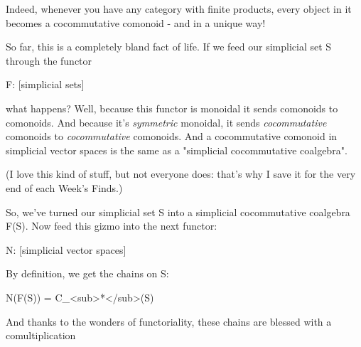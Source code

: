Indeed, whenever you have any category with finite products, every
object in it becomes a cocommutative comonoid - and in a unique way!

So far, this is a completely bland fact of life.
If we feed our simplicial set S through the functor

F: [simplicial sets] 

what happens?  Well, because this functor is monoidal it sends
comonoids to comonoids.  And because it's \emph{symmetric} monoidal, it
sends \emph{cocommutative} comonoids to \emph{cocommutative} comonoids.  And a
cocommutative comonoid in simplicial vector spaces is the same as a
"simplicial cocommutative coalgebra".  

(I love this kind of stuff, but not everyone does: that's why I
save it for the very end of each Week's Finds.)

So, we've turned our simplicial set S into a simplicial cocommutative
coalgebra F(S).  Now feed this gizmo into the next functor:

N: [simplicial vector spaces] 

By definition, we get the chains on S:

N(F(S)) = C_{<sub>*}</sub>(S)

And thanks to the wonders of functoriality, these chains are blessed
with a comultiplication



